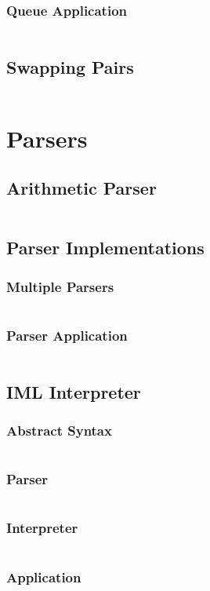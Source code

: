 \documentclass[a4paper,9pt,twoside]{book}
\newcommand{\scalafile}[1]{\inputminted[breaklines]{scala}{../scala/#1.scala}}
\begin{document}
\subsection{Queue Application}
\scalafile{generics/QueueTest}
\section{Swapping Pairs}
\scalafile{generics/Pair}

\chapter{Parsers}
\section{Arithmetic Parser}
\scalafile{parser/ArithmeticParser}
\section{Parser Implementations}
\subsection{Multiple Parsers}
\scalafile{parser/Parser}
\subsection{Parser Application}
\scalafile{parser/ParserTest}
\section{IML Interpreter}
\subsection{Abstract Syntax}
\scalafile{parser/Syntax}
\subsection{Parser}
\scalafile{parser/IMLParser}
\subsection{Interpreter}
\scalafile{parser/Interpreter}
\subsection{Application}
\scalafile{parser/Test}
\end{document}
